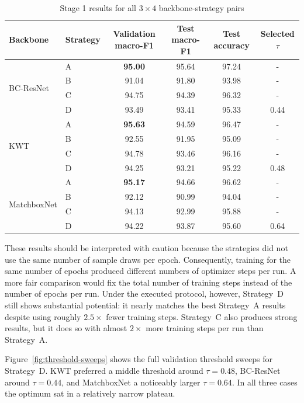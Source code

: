 \documentclass[11pt]{article}
\begin{document}
\begin{table}[b!]
\centering
\caption{Stage 1 results for all \(3\times4\) backbone-strategy pairs}
\label{tab:stage1-results}
\smallskip
\small
\setlength{\tabcolsep}{4pt}
\begin{tabular}{@{}llcccc@{}}
\toprule
\textbf{Backbone} & \textbf{Strategy} & \textbf{Validation macro-F1} & \textbf{Test macro-F1} & \textbf{Test accuracy} & \textbf{Selected \(\tau\)}\\
\midrule
\multirow{4}{*}{BC-ResNet}
 & A & \textbf{95.00} & 95.64 & 97.24 & - \\
 & B & 91.04 & 91.80 & 93.98 & - \\
 & C & 94.75 & 94.39 & 96.32 & - \\
 & D & 93.49 & 93.41 & 95.33 & 0.44 \\
\midrule
\multirow{4}{*}{KWT}
 & A & \textbf{95.63} & 94.59 & 96.47 & - \\
 & B & 92.55 & 91.95 & 95.09 & - \\
 & C & 94.78 & 93.46 & 96.16 & - \\
 & D & 94.25 & 93.21 & 95.22 & 0.48 \\
\midrule
\multirow{4}{*}{MatchboxNet}
 & A & \textbf{95.17} & 94.66 & 96.62 & - \\
 & B & 92.12 & 90.99 & 94.04 & - \\
 & C & 94.13 & 92.99 & 95.88 & - \\
 & D & 94.22 & 93.87 & 95.60 & 0.64 \\
\bottomrule
\end{tabular}
\end{table}

These results should be interpreted with caution because the strategies did not use the same number of sample draws per epoch. Consequently, training for the same number of epochs produced different numbers of optimizer steps per run. A more fair comparison would fix the total number of training steps instead of the number of epochs per run. Under the executed protocol, however, Strategy~D still shows substantial potential: it nearly matches the best Strategy~A results despite using roughly \(2.5\times\) fewer training steps. Strategy~C also produces strong results, but it does so with almost \(2\times\) more training steps per run than Strategy~A.

Figure~\ref{fig:threshold-sweeps} shows the full validation threshold sweeps for Strategy~D. KWT preferred a middle threshold around \(\tau=0.48\), BC-ResNet around \(\tau=0.44\), and MatchboxNet a noticeably larger \(\tau=0.64\). In all three cases the optimum sat in a relatively narrow plateau.
\end{document}
